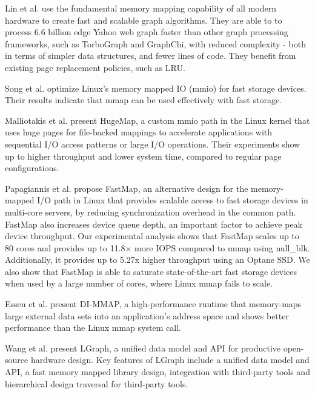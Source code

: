 Lin et al. \cite{lin2014mmap} use the fundamental memory mapping capability of all modern hardware to create fast and scalable graph algorithms. They are able to to process 6.6 billion edge Yahoo web graph faster than other graph processing frameworks, such as TorboGraph and GraphChi, with reduced complexity - both in terms of simpler data structures, and fewer lines of code. They benefit from existing page replacement policies, such as LRU.

Song et al. \cite{song2016efficient} optimize Linux's memory mapped IO (mmio) for fast storage devices. Their results indicate that mmap can be used effectively with fast storage.

Malliotakis et al. \cite{malliotakis2021hugemap} present HugeMap, a custom mmio path in the Linux kernel that uses huge pages for file-backed mappings to accelerate applications with sequential I/O access patterns or large I/O operations. Their experiments show up to higher throughput and lower system time, compared to regular page configurations.

Papagiannis et al. \cite{papagiannis2020optimizing} propose FastMap, an alternative design for the memory-mapped I/O path in Linux that provides scalable access to fast storage devices in multi-core servers, by reducing synchronization overhead in the common path. FastMap also increases device queue depth, an important factor to achieve peak device throughput. Our experimental analysis shows that FastMap scales up to 80 cores and provides up to 11.8× more IOPS compared to mmap using null\_blk. Additionally, it provides up to 5.27x higher throughput using an Optane SSD. We also show that FastMap is able to saturate state-of-the-art fast storage devices when used by a large number of cores, where Linux mmap fails to scale.

Essen et al. \cite{van2015di} present DI-MMAP, a high-performance runtime that memory-maps large external data sets into an application’s address space and shows better performance than the Linux mmap system call.

Wang et al. \cite{wang2019lgraph} present LGraph, a unified data model and API for productive open-source hardware design. Key features of LGraph include a
unified data model and API, a fast memory mapped library design, integration with third-party tools and hierarchical design traversal for third-party tools.

